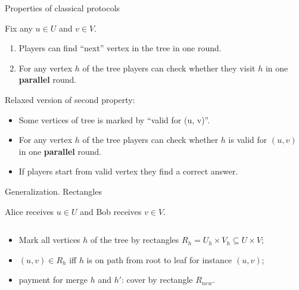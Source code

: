 \begin{frame}{Properties of classical protocols}

    Fix any $u \in U$ and $v \in V$.

    \pause
    \begin{enumerate}
        \item Players can find ``next'' vertex in the tree in one round.
        \item For any vertex $h$ of the tree players can check whether they visit $h$ in one
            \textbf{parallel} round.
    \end{enumerate}

    \pause
    Relaxed version of second property:
    \begin{itemize}
        \item Some vertices of tree is marked by ``valid for (u, v)''.
        \item For any vertex $h$ of the tree players can check whether $h$ is valid for $(u, v)$ in one
            \textbf{parallel} round.
        \item If players start from valid vertex they find a correct answer.
    \end{itemize}
    
\end{frame}

\begin{frame}{Generalization. Rectangles}

    Alice receives $u \in U$ and Bob receives $v \in V$.

    \begin{columns}[t]
		\begin{column}{0.6\textwidth}
            \begin{itemize}
                \item<2-> Mark all vertices $h$ of the tree by rectangles $R_h = U_h \times V_h \subseteq
                    U \times V$;
	            \item<4-> $(u, v) \in R_h$ iff $h$ is on path from root to leaf for instance $(u, v)$;
    		    \item<6-> payment for merge $h$ and $h'$: cover by rectangle $R_{new}$.
	        \end{itemize}
            
        \end{column}
        
		\begin{column}{0.3\textwidth}
		\end{column}
	\end{columns}
\end{frame}